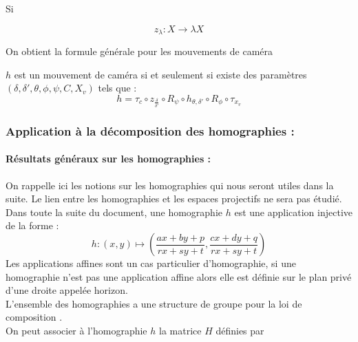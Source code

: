 Si

\begin{equation*}
z_{\lambda}:X\rightarrow \lambda X
\end{equation*}

On obtient la formule générale pour les mouvements de caméra
\begin{prop}  $h$ est un mouvement de caméra si et seulement si existe des paramètres $(\delta,\delta',\theta,\phi,\psi,C,X_v)$ tels que :
\begin{equation}
h= \tau_{c} \circ z_{\frac{\delta}{\delta'}}  \circ R_{\psi} \circ h_{\theta,\delta'} \circ R_{\phi} \circ \tau_{x_{v}}
\label{formul_decomp}
\end{equation}
\end{prop}



\subsubsection{Application à la décomposition des homographies :}
\paragraph{Résultats généraux sur les homographies :}
 On rappelle ici les notions sur les homographies qui nous seront utiles dans la suite. Le lien entre les homographies et les espaces projectifs ne sera pas étudié. Dans toute la suite du document, une homographie $h$ est une application injective de la forme :
	\[h:(x,y)\mapsto \left(\frac{ax+by+p}{rx+sy+t},\frac{cx+dy+q}{rx+sy+t}\right)\]
Les applications affines sont un cas particulier d'homographie, si une homographie n'est pas une application affine alors elle est définie sur le plan privé d'une droite appelée horizon.\\	
  L'ensemble des homographies a une structure de groupe pour la loi de composition .\\
  On peut  associer à l'homographie $h$ la matrice $H$ définies par
  
